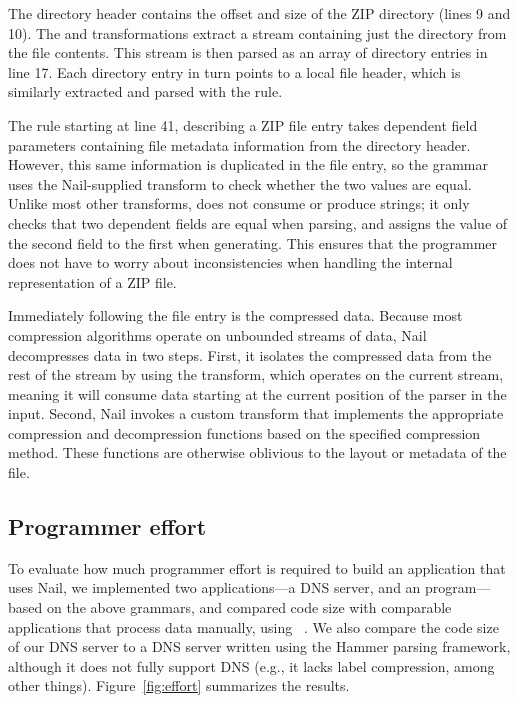 The directory header contains the offset and size of the ZIP
directory (lines 9 and 10). The  and 
transformations extract a stream containing just the directory from
the file contents. This stream is then parsed as an array of directory
entries in line 17.
Each directory entry in turn points to a local file header, which is
similarly extracted and parsed with the  rule.

The  rule starting at line 41, describing a ZIP file entry takes dependent field
parameters containing file metadata information from the directory
header. However, this same information is duplicated in the file
entry, so the grammar uses the Nail-supplied 
transform to check whether the two values are equal. Unlike most other
transforms,  does not consume or produce strings; it
only checks that two dependent fields are equal when parsing, and
assigns the value of the second field to the first when generating.
This ensures that the programmer does not have to worry about
inconsistencies when handling the internal representation of a ZIP
file.

Immediately following the file entry is the compressed data.  Because
most compression algorithms operate on unbounded streams of data, Nail
decompresses data in two steps.  First, it isolates the compressed
data from the rest of the stream by using the  transform,
which operates on the current stream, meaning it will consume data
starting at the current position of the parser in the input.  Second,
Nail invokes a custom  transform that implements
the appropriate compression and decompression functions based on the
specified compression method. These functions are otherwise oblivious
to the layout or metadata of the file.


\subsection{Programmer effort}
\label{s:eval-effort}


To evaluate how much programmer effort is required to build an
application that uses Nail, we implemented two applications---a
DNS server, and an
 program---based on the above grammars, and compared code
size with comparable applications that process data manually, using
~\cite{sloccount}.  We also compare the code size of our
DNS server to a DNS server written using the Hammer parsing framework,
although it does not fully support DNS (e.g., it lacks label compression,
among other things).  Figure~\ref{fig:effort} summarizes the results.

